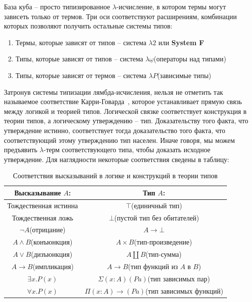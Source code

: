 База куба -- просто типизированное $\lambda$-исчисление, в котором термы могут зависеть только от термов. Три оси соответствуют расширениям, комбинации которых позволяют получить остальные системы типов:

\begin{enumerate}
  \item Термы, которые зависят от типов -- система $\lambda2$ или \textbf{System F}
  \item Типы, которые зависят от типов -- система $\lambda \underline{\omega}$(операторы над типами)
  \item Типы, которые зависят от термов -- система $\lambda P$(зависимые типы)
\end{enumerate}

Затронув системы типизации лямбда-исчисления, нельзя не отметить так называемое соответствие Карри-Говарда~\cite{howard1980formulae}, которое устанавливает прямую связь между логикой и теорией типов. Логической связке соответствует конструкция в теории типов, а логическому утверждению -- тип. Доказательству того факта, что утверждение истинно, соответствует тогда доказательство того факта, что соответствующий этому утверждению тип населен. Иначе говоря, мы можем предъявить $\lambda$-терм соответствующего типа, чтобы доказать исходное утверждение. Для наглядности некоторые соответствия сведены в таблицу:

\begin{table}[H]
  \centering
  \begin{tabular}{| c | c |}
    \hline
    Высказывание $A$: & Тип $A$: \\
    \hline
    Тождественная истинна & $\top$(единичный тип) \\
    \hline
    Тождественная ложь & $\bot$(пустой тип без обитателей) \\
    \hline
    $\lnot A$(отрицание) & $A \to \bot$ \\
    \hline
    $A \land B$(конъюнкция) & $A \times B$(тип-произведение) \\
    \hline
    $A \lor B$(дизъюнкция) & $A \coprod B$(тип-сумма) \\
    \hline
    $A \to B$(импликация) & $A \to B$(тип функций из $A$ в $B$) \\
    \hline
    $\exists x.P(x)$ & $\Sigma (x : A) (P a)$(тип зависимых пар) \\
    \hline
    $\forall x.P(x)$ & $\Pi (x : A) \to (P a)$(тип зависимых функций) \\
    \hline
  \end{tabular}
  \caption{Соответствия высказываний в логике и конструкций в теории типов}
\end{table}

